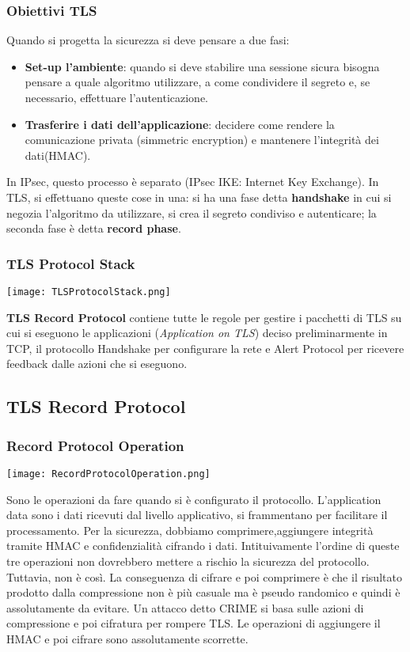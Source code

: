 \documentclass{article}
\theoremstyle{remark}
\begin{document}
\subsubsection{Obiettivi TLS}
Quando si progetta la sicurezza si deve pensare a due fasi:\begin{itemize}
	\item \textbf{Set-up l'ambiente}: quando si deve stabilire una sessione sicura bisogna pensare a quale algoritmo utilizzare, a come condividere il segreto e, se necessario, effettuare l'autenticazione.
	\item \textbf{Trasferire i dati dell'applicazione}: decidere come rendere la comunicazione privata (simmetric encryption) e mantenere l'integrità dei dati(HMAC).
\end{itemize}
In IPsec, questo processo è separato (IPsec IKE: Internet Key Exchange). In TLS, si effettuano queste cose in una: si ha una fase detta \textbf{handshake} in cui si negozia l'algoritmo da utilizzare, si crea il segreto condiviso e autenticare; la seconda fase è detta \textbf{record phase}.
\subsubsection{TLS Protocol Stack}
\begin{center}
	\texttt{[image: TLSProtocolStack.png]}
\end{center}
\textbf{TLS Record Protocol} contiene tutte le regole per gestire i pacchetti di TLS su cui si eseguono le applicazioni (\emph{Application on TLS}) deciso preliminarmente in TCP, il protocollo Handshake per configurare la rete e Alert Protocol per ricevere feedback dalle azioni che si eseguono.
\subsection{TLS Record Protocol}
\subsubsection{Record Protocol Operation}
\begin{center}
	\texttt{[image: RecordProtocolOperation.png]}
\end{center}
Sono le operazioni da fare quando si è configurato il protocollo.
L'application data sono i dati ricevuti dal livello applicativo, si frammentano per facilitare il processamento. Per la sicurezza, dobbiamo comprimere,aggiungere integrità tramite HMAC e confidenzialità cifrando i dati. Intituivamente l'ordine di queste tre operazioni non dovrebbero mettere a rischio la sicurezza del protocollo. Tuttavia, non è così.\newline
La conseguenza di cifrare e poi comprimere è che il risultato prodotto dalla compressione non è più casuale ma è pseudo randomico e quindi è assolutamente da evitare. Un attacco detto CRIME si basa sulle azioni di compressione e poi cifratura per rompere TLS.\newline
Le operazioni di aggiungere il HMAC e poi cifrare sono assolutamente scorrette.
\newpage
\end{document}
